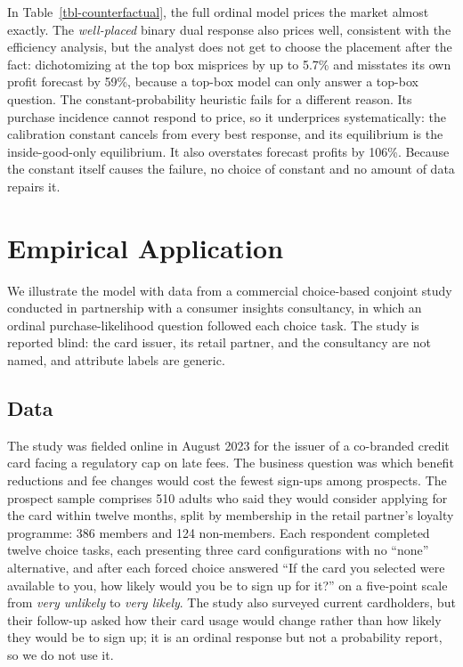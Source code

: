 \documentclass[
  letterpaper,
  DIV=11,
  numbers=noendperiod]{scrartcl}
\newcounter{none} %
\theoremstyle{plain}
\theoremstyle{plain}
\theoremstyle{plain}
\theoremstyle{remark}
\begin{document}
In Table~\ref{tbl-counterfactual}, the full ordinal model prices the
market almost exactly. The \emph{well-placed} binary dual response also
prices well, consistent with the efficiency analysis, but the analyst
does not get to choose the placement after the fact: dichotomizing at
the top box misprices by up to 5.7\% and misstates its own profit
forecast by 59\%, because a top-box model can only answer a top-box
question. The constant-probability heuristic fails for a different
reason. Its purchase incidence cannot respond to price, so it
underprices systematically: the calibration constant cancels from every
best response, and its equilibrium is the inside-good-only equilibrium.
It also overstates forecast profits by 106\%. Because the constant
itself causes the failure, no choice of constant and no amount of data
repairs it.

\section{Empirical Application}\label{sec-analysis}

We illustrate the model with data from a commercial choice-based
conjoint study conducted in partnership with a consumer insights
consultancy, in which an ordinal purchase-likelihood question followed
each choice task. The study is reported blind: the card issuer, its
retail partner, and the consultancy are not named, and attribute labels
are generic.

\subsection{Data}\label{sec-data}

The study was fielded online in August 2023 for the issuer of a
co-branded credit card facing a regulatory cap on late fees. The
business question was which benefit reductions and fee changes would
cost the fewest sign-ups among prospects. The prospect sample comprises
510 adults who said they would consider applying for the card within
twelve months, split by membership in the retail partner's loyalty
programme: 386 members and 124 non-members. Each respondent completed
twelve choice tasks, each presenting three card configurations with no
``none'' alternative, and after each forced choice answered ``If the
card you selected were available to you, how likely would you be to sign
up for it?'' on a five-point scale from \emph{very unlikely} to
\emph{very likely}. The study also surveyed current cardholders, but
their follow-up asked how their card usage would change rather than how
likely they would be to sign up; it is an ordinal response but not a
probability report, so we do not use it.
\end{document}

